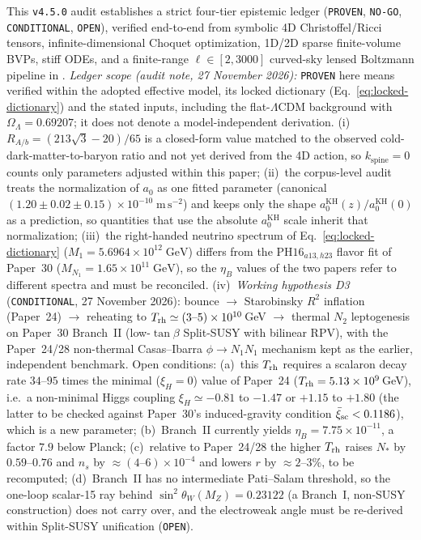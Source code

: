 \documentclass[11pt,a4paper]{article}
\begin{document}
This \texttt{v4.5.0} audit establishes a strict four-tier epistemic ledger ({\upshape\texttt{PROVEN}}, {\upshape\texttt{NO-GO}}, {\upshape\texttt{CONDITIONAL}}, {\upshape\texttt{OPEN}}), verified end-to-end from symbolic 4D Christoffel/Ricci tensors, infinite-dimensional Choquet optimization, 1D/2D sparse finite-volume BVPs, stiff ODEs, and a finite-range $\ell \in [2,3000]$ curved-sky lensed Boltzmann pipeline in . \emph{Ledger scope (audit note, 27 November 2026):} \texttt{PROVEN} here means verified within the adopted effective model, its locked dictionary (Eq.~\eqref{eq:locked-dictionary}) and the stated inputs, including the flat-$\Lambda$CDM background with $\Omega_\Lambda = 0.69207$; it does not denote a model-independent derivation. (i)~$R_{A/b} = (213\sqrt{3}-20)/65$ is a closed-form value matched to the observed cold-dark-matter-to-baryon ratio and not yet derived from the 4D action, so $k_{\mathrm{spine}} = 0$ counts only parameters adjusted within this paper; (ii)~the corpus-level audit treats the normalization of $a_0$ as one fitted parameter (canonical $(1.20\pm 0.02\pm 0.15)\times 10^{-10}\;\mathrm{m\,s^{-2}}$) and keeps only the shape $a_0^{\mathrm{KH}}(z)/a_0^{\mathrm{KH}}(0)$ as a prediction, so quantities that use the absolute $a_0^{\mathrm{KH}}$ scale inherit that normalization; (iii)~the right-handed neutrino spectrum of Eq.~\eqref{eq:locked-dictionary} ($M_1 = 5.6964\times 10^{12}\;\mathrm{GeV}$) differs from the $\mathrm{PH16}_{a13,h23}$ flavor fit of Paper~30 ($M_{N_1} = 1.65\times 10^{11}\;\mathrm{GeV}$), so the $\eta_B$ values of the two papers refer to different spectra and must be reconciled. (iv)~\emph{Working hypothesis D3} (\texttt{CONDITIONAL}, 27 November 2026): bounce $\to$ Starobinsky $R^2$ inflation (Paper~24) $\to$ reheating to $T_{\rm rh}\simeq(3\text{--}5)\times10^{10}$\,GeV $\to$ thermal $N_2$ leptogenesis on Paper~30 Branch~II (low-$\tan\beta$ Split-SUSY with bilinear RPV), with the Paper~24/28 non-thermal Casas--Ibarra $\phi\to N_1N_1$ mechanism kept as the earlier, independent benchmark. Open conditions: (a)~this $T_{\rm rh}$ requires a scalaron decay rate $34$--$95$ times the minimal ($\xi_H=0$) value of Paper~24 ($T_{\rm rh}=5.13\times10^{9}$\,GeV), i.e.\ a non-minimal Higgs coupling $\xi_H\simeq-0.81$ to $-1.47$ or $+1.15$ to $+1.80$ (the latter to be checked against Paper~30's induced-gravity condition $\bar\xi_{\rm sc}<0.1186$), which is a new parameter; (b)~Branch~II currently yields $\eta_B=7.75\times10^{-11}$, a factor $7.9$ below Planck; (c)~relative to Paper~24/28 the higher $T_{\rm rh}$ raises $N_*$ by $0.59$--$0.76$ and $n_s$ by $\approx(4\text{--}6)\times10^{-4}$ and lowers $r$ by $\approx2$--$3\%$, to be recomputed; (d)~Branch~II has no intermediate Pati--Salam threshold, so the one-loop scalar-15 ray behind $\sin^2\theta_W(M_Z)=0.23122$ (a Branch~I, non-SUSY construction) does not carry over, and the electroweak angle must be re-derived within Split-SUSY unification (\texttt{OPEN}).
\end{document}
